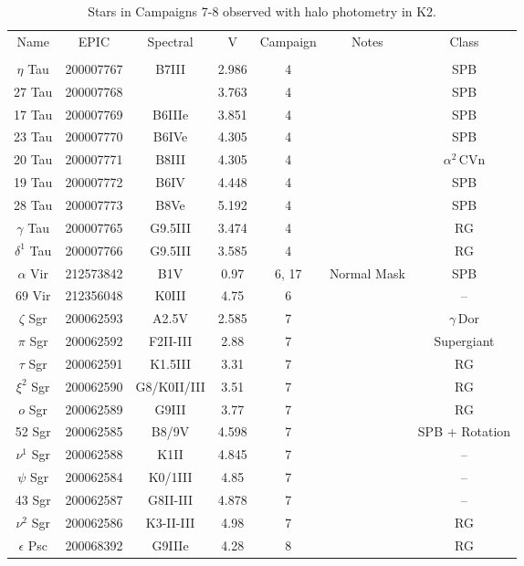 \begin{table*}
\caption{Stars in Campaigns 7-8 observed with halo photometry in K2.\label{table_0}}
\begin{tabular}{ccccccc}
\hline \hline
Name & EPIC & Spectral & V & Campaign & Notes & Class \\
 &  &  &  &  &  &  \\
\hline
$\eta$ Tau & 200007767 & B7III & 2.986 & 4 & \tablenotemark{a} & SPB \\
27 Tau & 200007768 &  & 3.763 & 4 & \tablenotemark{a} & SPB \\
17 Tau & 200007769 & B6IIIe & 3.851 & 4 & \tablenotemark{a} & SPB \\
23 Tau & 200007770 & B6IVe & 4.305 & 4 & \tablenotemark{a} & SPB \\
20 Tau & 200007771 & B8III & 4.305 & 4 & \tablenotemark{a} & $\alpha^2\,\text{CVn}$ \\
19 Tau & 200007772 & B6IV & 4.448 & 4 & \tablenotemark{a} & SPB \\
28 Tau & 200007773 & B8Ve & 5.192 & 4 & \tablenotemark{a} & SPB \\
$\gamma$ Tau & 200007765 & G9.5III & 3.474 & 4 &  & RG \\
$\delta^{1}$ Tau & 200007766 & G9.5III & 3.585 & 4 &  & RG \\
$\alpha$ Vir & 212573842 & B1V & 0.97 & 6, 17 & Normal Mask & SPB \\
69 Vir & 212356048 & K0III & 4.75 & 6 &  & -- \\
$\zeta$ Sgr & 200062593 & A2.5V & 2.585 & 7 &  & $\gamma\,\text{Dor}$ \\
$\pi$ Sgr & 200062592 & F2II-III & 2.88 & 7 &  & Supergiant \\
$\tau$ Sgr & 200062591 & K1.5III & 3.31 & 7 &  & RG \\
$\xi^{2}$ Sgr & 200062590 & G8/K0II/III & 3.51 & 7 &  & RG \\
$o$ Sgr & 200062589 & G9III & 3.77 & 7 &  & RG \\
52 Sgr & 200062585 & B8/9V & 4.598 & 7 &  & SPB + Rotation \\
$\nu^{1}$ Sgr & 200062588 & K1II & 4.845 & 7 &  & -- \\
$\psi$ Sgr & 200062584 & K0/1III & 4.85 & 7 &  & -- \\
43 Sgr & 200062587 & G8II-III & 4.878 & 7 &  & -- \\
$\nu^{2}$ Sgr & 200062586 & K3-II-III & 4.98 & 7 &  & RG \\
$\epsilon$ Psc & 200068392 & G9IIIe & 4.28 & 8 &  & RG \\

\end{tabular}
\end{table*}
